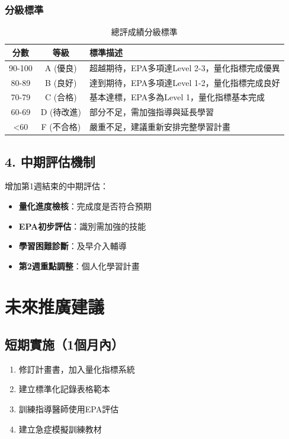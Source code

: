 \documentclass[12pt,a4paper]{article}
\begin{document}
\subsubsection{分級標準}
\begin{table}[h]
\centering
\caption{總評成績分級標準}
\begin{tabular}{|c|c|p{8cm}|}
\hline
\textbf{分數} & \textbf{等級} & \textbf{標準描述} \\
\hline
90-100 & A (優良) & 超越期待，EPA多項達Level 2-3，量化指標完成優異 \\
\hline
80-89 & B (良好) & 達到期待，EPA多項達Level 1-2，量化指標完成良好 \\
\hline
70-79 & C (合格) & 基本達標，EPA多為Level 1，量化指標基本完成 \\
\hline
60-69 & D (待改進) & 部分不足，需加強指導與延長學習 \\
\hline
<60 & F (不合格) & 嚴重不足，建議重新安排完整學習計畫 \\
\hline
\end{tabular}
\end{table}

\subsection{4. 中期評估機制}

增加第1週結束的中期評估：

\begin{itemize}
\item \textbf{量化進度檢核}：完成度是否符合預期
\item \textbf{EPA初步評估}：識別需加強的技能
\item \textbf{學習困難診斷}：及早介入輔導
\item \textbf{第2週重點調整}：個人化學習計畫
\end{itemize}

\section{未來推廣建議}

\subsection{短期實施（1個月內）}
\begin{enumerate}
\item 修訂計畫書，加入量化指標系統
\item 建立標準化記錄表格範本
\item 訓練指導醫師使用EPA評估
\item 建立急症模擬訓練教材
\end{enumerate}
\end{document}
